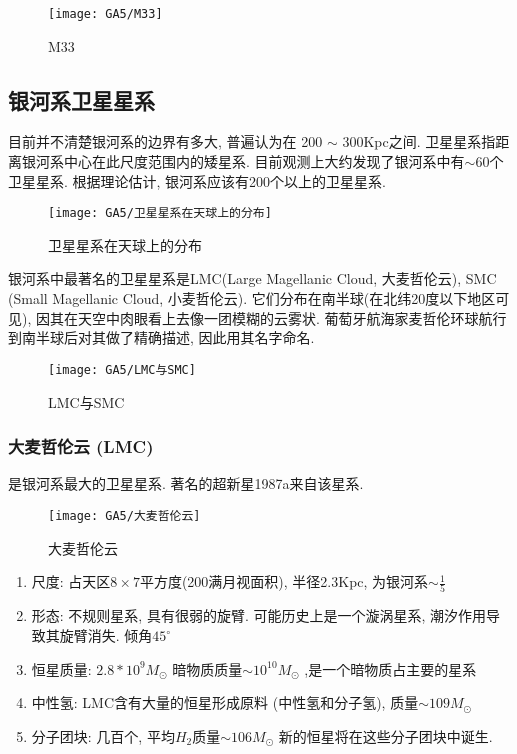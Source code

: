 \begin{figure}[!htb]
    \centering
    \texttt{[image: GA5/M33]}
    \caption{M33}
\end{figure}


\subsection{银河系卫星星系}
目前并不清楚银河系的边界有多大, 普遍认为在 200 $\sim $ 300Kpc之间. 卫星星系指距离银河系中心在此尺度范围内的矮星系. 目前观测上大约发现了银河系中有$\sim $60个卫星星系. 根据理论估计, 银河系应该有200个以上的卫星星系. 

\begin{figure}[!htb]
    \centering
    \texttt{[image: GA5/卫星星系在天球上的分布]}
    \caption{卫星星系在天球上的分布}
\end{figure}

\small
银河系中最著名的卫星星系是LMC(Large Magellanic Cloud, 大麦哲伦云), SMC (Small Magellanic Cloud, 小麦哲伦云). 它们分布在南半球(在北纬20度以下地区可见), 因其在天空中肉眼看上去像一团模糊的云雾状. 葡萄牙航海家麦哲伦环球航行到南半球后对其做了精确描述, 因此用其名字命名. 
\normalsize

\begin{figure}[!htb]
    \centering
    \texttt{[image: GA5/LMC与SMC]}
    \caption{LMC与SMC}
\end{figure}


\subsubsection{大麦哲伦云 (LMC)}
是银河系最大的卫星星系. 著名的超新星1987a来自该星系. 

\begin{figure}[!htb]
    \centering
    \texttt{[image: GA5/大麦哲伦云]}
    \caption{大麦哲伦云}
\end{figure}

\begin{enumerate}\small
    \item 尺度: 占天区$8\times 7$平方度(200满月视面积), 半径2.3Kpc, 为银河系$\sim \frac{1}{5}$
    \item 形态: 不规则星系, 具有很弱的旋臂. 可能历史上是一个漩涡星系, 潮汐作用导致其旋臂消失. 倾角$45^{\circ}$
    \item 恒星质量: $2.8*10^9M_{\odot}$ 暗物质质量$\sim 10^{10}M_{\odot}$ ,是一个暗物质占主要的星系
    \item 中性氢: LMC含有大量的恒星形成原料 (中性氢和分子氢), 质量$\sim 10 9M_{\odot}$
    \item 分子团块: 几百个,  平均$H_2$质量$\sim 10 6M_{\odot}$ 新的恒星将在这些分子团块中诞生. 
\end{enumerate}

